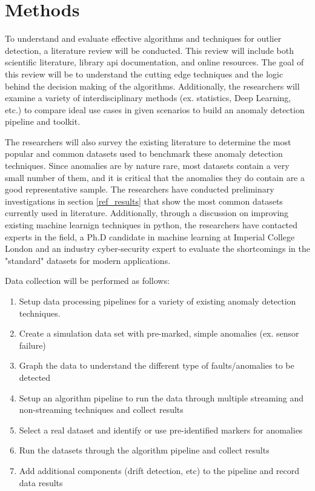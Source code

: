 \section{Methods}
\label{ref_methods}

To understand and evaluate effective algorithms and techniques for outlier detection, a literature review will be conducted. This review will include both scientific literature, library api documentation, and online resources. The goal of this review will be to understand the cutting edge techniques and the logic behind the decision making of the algorithms. Additionally, the researchers will examine a variety of interdisciplinary methods (ex. statistics, Deep Learning, etc.) to compare ideal use cases in given scenarios to build an anomaly detection pipeline and toolkit.  

The researchers will also survey the existing literature to determine the most popular and common datasets used to benchmark these anomaly detection techniques. Since anomalies are by nature rare, most datasets contain a very small number of them, and it is critical that the anomalies they do contain are a good representative sample. The researchers have conducted preliminary investigations in section \ref{ref_results} that show the most common datasets currently used in literature.  Additionally, through a discussion on improving existing machine learnign techniques in python, the researchers have contacted experts in the field, a Ph.D candidate in machine learning at Imperial College London and an industry cyber-security expert to evaluate the shortcomings in the "standard" datasets for modern applications. 

Data collection will be performed as follows:
\begin{enumerate}[leftmargin=2cm]
    \item Setup data processing pipelines for a variety of existing anomaly detection techniques.
    \item Create a simulation data set with pre-marked, simple anomalies (ex. sensor failure) 
    \item Graph the data to understand the different type of faults/anomalies to be detected
    \item Setup an algorithm pipeline to run the data through multiple streaming and non-streaming techniques and collect results
    \item Select a real dataset and identify or use pre-identified markers for anomalies
    \item Run the datasets through the algorithm pipeline and collect results
    \item Add additional components (drift detection, etc) to the pipeline and record data results 
\end{enumerate}

